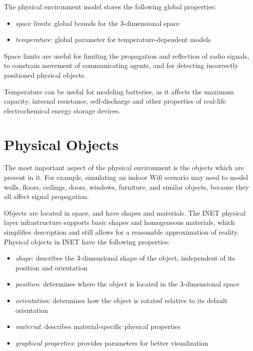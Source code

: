 The physical environment model stores the following global
properties:

\begin{itemize}
  \item \textit{space limits}: global bounds for the 3-dimensional space
  \item \textit{temperature}: global parameter for temperature-dependent models
\end{itemize}

Space limits are useful for limiting the propagation and reflection of
radio signals, to constrain movement of communicating agents, and for
detecting incorrectly positioned physical objects.

Temperature can be useful for modeling batteries, as it affects the
maximum capacity, internal resistance, self-discharge and other properties
of real-life electrochemical energy storage devices.

\section{Physical Objects}

The most important aspect of the physical environment is the objects which
are present in it. For example, simulating an indoor Wifi scenario may need
to model walls, floors, ceilings, doors, windows, furniture, and similar
objects, because they all affect signal propagation.

Objects are located in space, and have shapes and materials. The INET
physical layer infrastructure supports basic shapes and homogeneous
materials, which simplifies description and still allows for a reasonable
approximation of reality. Physical objects in INET have the following
properties:

\begin{itemize}
  \item \textit{shape}: describes the 3-dimensional shape of the object,
    independent of its position and orientation
  \item \textit{position}: determines where the object is located in the 3-dimensional space
  \item \textit{orientation}: determines how the object is rotated relative to its
    default orientation
  \item \textit{material}: describes material-specific physical properties
  \item \textit{graphical properties}: provides parameters for better visualization
\end{itemize}

